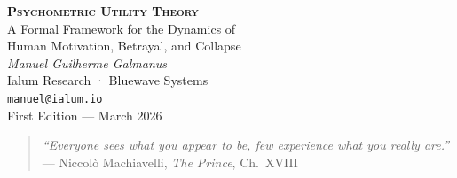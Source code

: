 \documentclass[12pt, a4paper]{article}
\theoremstyle{remark}
\begin{document}

\begin{titlepage}
\centering
\vspace*{3cm}

{\Huge\bfseries\scshape Psychometric Utility Theory}\\[0.8cm]
{\Large A Formal Framework for the Dynamics of\\[0.3cm]
Human Motivation, Betrayal, and Collapse}\\[2.5cm]

{\large\textit{Manuel Guilherme Galmanus}}\\[0.5cm]
{\normalsize Ialum Research · Bluewave Systems}\\[0.3cm]
{\small \texttt{manuel@ialum.io}}\\[3cm]

{\normalsize First Edition — March 2026}\\[1cm]

\vfill

\begin{quote}
\centering
\textit{``Everyone sees what you appear to be, few experience what you really are.''}\\
— Niccolò Machiavelli, \textit{The Prince}, Ch.\ XVIII
\end{quote}

\vspace{1.5cm}
\end{titlepage}


\tableofcontents
\newpage

\end{document}
